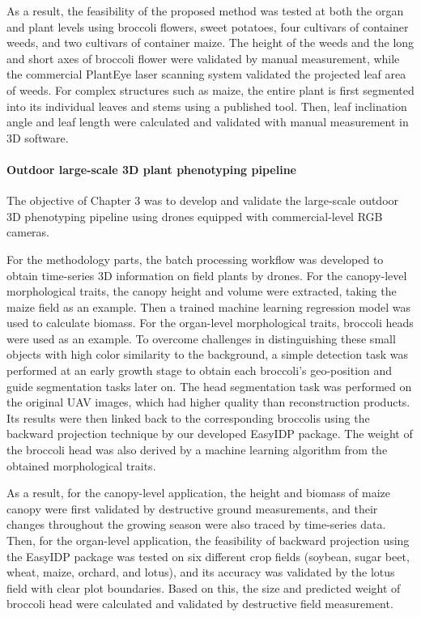 \begin{eabstract}
  As a result, the feasibility of the proposed method was tested at both the organ and plant levels using broccoli flowers, sweet potatoes, four cultivars of container weeds, and two cultivars of container maize. The height of the weeds and the long and short axes of broccoli flower were validated by manual measurement, while the commercial PlantEye laser scanning system validated the projected leaf area of weeds. For complex structures such as maize, the entire plant is first segmented into its individual leaves and stems using a published tool. Then, leaf inclination angle and leaf length were calculated and validated with manual measurement in 3D software. 

 \paragraph{Outdoor large-scale 3D plant phenotyping pipeline}

  The objective of Chapter 3 was to develop and validate the large-scale outdoor 3D phenotyping pipeline using drones equipped with commercial-level RGB cameras.

  For the methodology parts, the batch processing workflow was developed to obtain time-series 3D information on field plants by drones. For the canopy-level morphological traits, the canopy height and volume were extracted, taking the maize field as an example. Then a trained machine learning regression model was used to calculate biomass. For the organ-level morphological traits, broccoli heads were used as an example. To overcome challenges in distinguishing these small objects with high color similarity to the background, a simple detection task was performed at an early growth stage to obtain each broccoli’s geo-position and guide segmentation tasks later on. The head segmentation task was performed on the original UAV images, which had higher quality than reconstruction products. Its results were then linked back to the corresponding broccolis using the backward projection technique by our developed EasyIDP package. The weight of the broccoli head was also derived by a machine learning algorithm from the obtained morphological traits.

  As a result, for the canopy-level application, the height and biomass of maize canopy were first validated by destructive ground measurements, and their changes throughout the growing season were also traced by time-series data. Then, for the organ-level application, the feasibility of backward projection using the EasyIDP package was tested on six different crop fields (soybean, sugar beet, wheat, maize, orchard, and lotus), and its accuracy was validated by the lotus field with clear plot boundaries. Based on this, the size and predicted weight of broccoli head were calculated and validated by destructive field measurement.


\end{eabstract}
